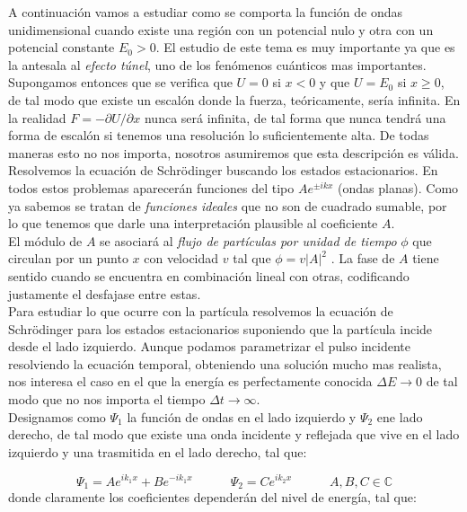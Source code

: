 \documentclass[12pt,a4paper]{article}
\numberwithin{equation}{section}
\numberwithin{figure}{section}
\newcommand{\tquad}{\quad \quad \quad}
\begin{document}
A continuación vamos a estudiar como se comporta la función de ondas unidimensional cuando existe una región con un potencial nulo y otra con un potencial constante $E_0>0$. El estudio de este tema es muy importante ya que es la antesala al \textit{efecto túnel}, uno de los fenómenos cuánticos mas importantes. \\


Supongamos entonces que se verifica que $U=0$ si $x<0$ y que $U=E_0$ si $x \geq 0$, de tal modo que existe un escalón donde la fuerza, teóricamente, sería infinita. En la realidad $F=- \partial U / \partial x$ nunca será infinita, de tal forma que nunca tendrá una forma de escalón si tenemos una resolución lo suficientemente alta. De todas maneras esto no nos importa, nosotros asumiremos que esta descripción es válida. \\

Resolvemos la ecuación de Schrödinger buscando los estados estacionarios. En todos estos problemas aparecerán funciones del tipo $Ae^{\pm ik  x}$ (ondas planas). Como ya sabemos se tratan de \textit{funciones ideales} que no son de cuadrado sumable, por lo que tenemos que darle una interpretación plausible al coeficiente $A$. \\

El módulo de $A$ se asociará al \textit{flujo de partículas por unidad de tiempo} $\phi$ que circulan por un punto $x$ con velocidad $v$ tal que $\phi = v |A|^2$ . La fase de $A$ tiene sentido cuando se encuentra en combinación lineal con otras, codificando justamente el desfajase entre estas. \\

Para estudiar lo que ocurre con la partícula resolvemos la ecuación de Schrödinger para los estados estacionarios suponiendo que la partícula incide desde el lado izquierdo. Aunque podamos parametrizar el pulso incidente resolviendo la ecuación temporal, obteniendo una solución mucho mas realista, nos interesa el caso en el que la energía es perfectamente conocida $\Delta E \rightarrow 0$ de tal modo que no nos importa el tiempo $\Delta t \rightarrow \infty$. \\

Designamos como $\Psi_1$ la función de ondas en el lado izquierdo y $\Psi_2$ ene lado derecho, de tal modo que existe una onda incidente y reflejada que vive en el lado izquierdo y una trasmitida en el lado derecho, tal que:

\begin{equation}
\Psi_1 = A e^{ik_1x} + B e^{-ik_1 x} \tquad \Psi_2 = C e^{ik_2x} \tquad A,B,C \in \mathbb{C}
\end{equation}
donde claramente los coeficientes dependerán del nivel de energía, tal que:
\end{document}
